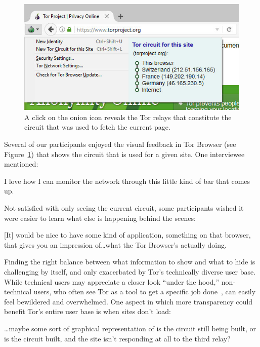 \begin{figure}[t]
    \centering
    \includegraphics[width=\linewidth]{figures/tor-button-screenshot.jpg}
    \caption{A click on the onion icon reveals the Tor relays that constitute
    the circuit that was used to fetch the current page.}
    \label{fig:tor-button}
\end{figure}

Several of our participants enjoyed the visual feedback in Tor Browser (see
Figure~\ref{fig:tor-button}) that shows the circuit that is used for a given
site.  One interviewee mentioned:

\begin{displayquote}
I love how I can monitor the network through this little kind of bar that comes
up.
\end{displayquote}

Not satisfied with only seeing the current circuit, some participants wished it
were easier to learn what else is happening behind the scenes:

\begin{displayquote}
{[It]} would be nice to have some kind of application, something on that browser,
that gives you an impression of\dots what the Tor Browser's actually doing.
\end{displayquote}

Finding the right balance between what information to show and what to hide is
challenging by itself, and only exacerbated by Tor's technically diverse user
base.  While technical users may appreciate a closer look ``under the hood,''
non-technical users, who often see Tor as a tool to get a specific job
done~\cite[\S~4.3.2]{Gallagher2017a}, can easily feel bewildered and
overwhelmed.  One aspect in which more transparency could benefit Tor's entire
user base is when sites don't load:

\begin{displayquote}
\dots maybe some sort of graphical representation of is the circuit still
being built, or is the circuit built, and the site isn't responding at all to
the third relay?
\end{displayquote}

